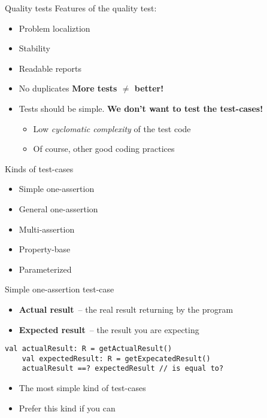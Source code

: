 \documentclass[aspectratio=169]{beamer}
\begin{document}
\begin{frame}{Quality tests}
  Features of the quality test:
  \begin{itemize}
    \item Problem localiztion
    \item Stability
    \item Readable reports
    \item No duplicates \textbf{More tests $\ne$ better!}
    \item Tests should be simple. \textbf{We don't want to test the test-cases!}
    \pause
      \begin{itemize}
        \item Low \textit{cyclomatic complexity} of the test code
        \item Of course, other good coding practices
      \end{itemize}
  \end{itemize}
\end{frame}

\begin{frame}{Kinds of test-cases}
  \begin{itemize}
    \item Simple one-assertion
    \item General one-assertion
    \item Multi-assertion
    \item Property-base
    \item Parameterized
  \end{itemize}
\end{frame}

\begin{frame}[fragile]{Simple one-assertion test-case}
  \begin{itemize}
    \item \textbf{Actual result}~-- the real result returning by the program
    \item \textbf{Expected result}~-- the result you are expecting
  \end{itemize}
  \begin{lstlisting}[style=scala]
    val actualResult: R = getActualResult()
    val expectedResult: R = getExpecatedResult()
    actualResult ==? expectedResult // is equal to?
  \end{lstlisting}
  \begin{itemize}
    \item The most simple kind of test-cases
    \item Prefer this kind if you can
  \end{itemize}
\end{frame}
\end{document}
